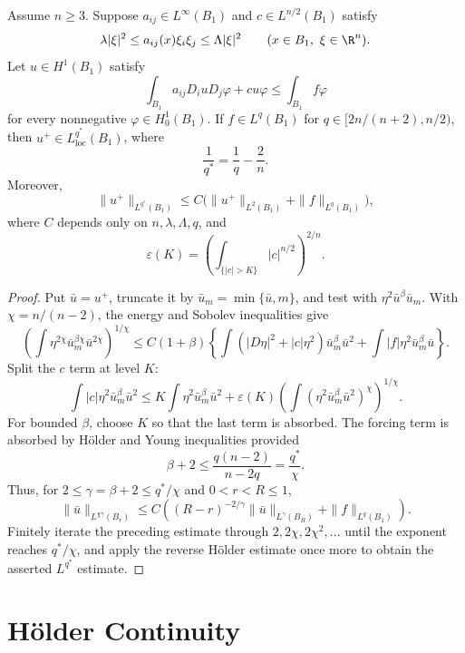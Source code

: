 \begin{theorem}\label{hanlin:weaksol-part2-high-integrability}
Assume $n\geq3$. Suppose $a_{ij}\in L^\infty(B_1)$ and
$c\in L^{n/2}(B_1)$ satisfy
\[
\lambda|\xi|^2\leq a_{ij}(x)\xi_i\xi_j\leq\Lambda|\xi|^2
\qquad(x\in B_1,\ \xi\in\R^n).
\]
Let $u\in H^1(B_1)$ satisfy
\[
\int_{B_1}a_{ij}D_i uD_j\varphi+cu\varphi
\leq\int_{B_1}f\varphi
\]
for every nonnegative $\varphi\in H^1_0(B_1)$. If
$f\in L^q(B_1)$ for
$q\in[2n/(n+2),n/2)$, then
$u^+\in L^{q^*}_{\mathrm{loc}}(B_1)$, where
\[
\frac1{q^*}=\frac1q-\frac2n.
\]
Moreover,
\[
\|u^+\|_{L^{q^*}(B_1)}
\leq C\bigl(\|u^+\|_{L^2(B_1)}+\|f\|_{L^q(B_1)}\bigr),
\]
where $C$ depends only on $n,\lambda,\Lambda,q$, and
\[
\varepsilon(K)=
\left(\int_{\{|c|>K\}}|c|^{n/2}\right)^{2/n}.
\]
\end{theorem}
\begin{proof}
\sketch Put $\bar u=u^+$, truncate it by
$\bar u_m=\min\{\bar u,m\}$, and test with
$\eta^2\bar u^\beta\bar u_m$. With $\chi=n/(n-2)$, the energy and Sobolev
inequalities give
\[
\left(\int\eta^{2\chi}\bar u_m^{\beta\chi}\bar u^{2\chi}
\right)^{1/\chi}
\leq C(1+\beta)\left\{
\int(|D\eta|^2+|c|\eta^2)\bar u_m^\beta\bar u^2
+\int|f|\eta^2\bar u_m^\beta\bar u\right\}.
\]
Split the $c$ term at level $K$:
\[
\int|c|\eta^2\bar u_m^\beta\bar u^2
\leq K\int\eta^2\bar u_m^\beta\bar u^2
+\varepsilon(K)
\left(\int(\eta^2\bar u_m^\beta\bar u^2)^\chi\right)^{1/\chi}.
\]
For bounded $\beta$, choose $K$ so that the last term is absorbed. The
forcing term is absorbed by H\"older and Young inequalities provided
\[
\beta+2\leq\frac{q(n-2)}{n-2q}=\frac{q^*}{\chi}.
\]
Thus, for $2\leq\gamma=\beta+2\leq q^*/\chi$ and $0<r<R\leq1$,
\begin{equation}
\|\bar u\|_{L^{\chi\gamma}(B_r)}
\leq C\left((R-r)^{-2/\gamma}
\|\bar u\|_{L^\gamma(B_R)}+\|f\|_{L^q(B_1)}\right).
\end{equation}
Finitely iterate the preceding estimate through $2,2\chi,2\chi^2,\ldots$
until the exponent
reaches $q^*/\chi$, and apply the reverse H\"older estimate once more to
obtain the asserted
$L^{q^*}$ estimate.
\end{proof}

\section{H\"older Continuity}

